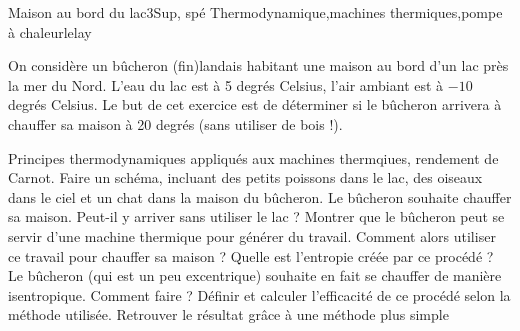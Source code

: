 \begin{exercise}{Maison au bord du lac}{3}{Sup, spé}
{Thermodynamique,machines thermiques,pompe à chaleur}{lelay}

On considère un bûcheron (fin)landais habitant une maison au bord d'un lac près la mer du Nord. L'eau du lac est à 5 degrés Celsius, l'air ambiant est à $-10$ degrés Celsius. Le but de cet exercice est de déterminer si le bûcheron arrivera à chauffer sa maison à 20 degrés (sans utiliser de bois !).

\begin{questions}
    \questioncours Principes thermodynamiques appliqués aux machines thermqiues, rendement de Carnot.
    \question Faire un schéma, incluant des petits poissons dans le lac, des oiseaux dans le ciel et un chat dans la maison du bûcheron.
    \question Le bûcheron souhaite chauffer sa maison. Peut-il y arriver sans utiliser le lac ?
    \question Montrer que le bûcheron peut se servir d'une machine thermique pour générer du travail. Comment alors utiliser ce travail pour chauffer sa maison ? Quelle est l'entropie créée par ce procédé ?
    \question Le bûcheron (qui est un peu excentrique) souhaite en fait se chauffer de manière isentropique. Comment faire ?
    \question Définir et calculer l'efficacité de ce procédé selon la méthode utilisée.
    \question Retrouver le résultat grâce à une méthode plus simple
\end{questions}

\end{exercise}


